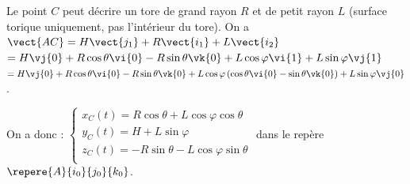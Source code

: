 \begin{corrigebox}
Le point $C$ peut décrire un tore de grand rayon $R$ et de petit rayon $L$ (surface torique uniquement, pas l'intérieur du tore).
On  a  $\vect{AC}=H\vect{j_1}+R\vect{i_1}+L\vect{i_2}$ $=H\vj{0}+R\cos\theta\vi{0}-R\sin\theta\vk{0}+L\cos\varphi\vi{1}+L\sin\varphi\vj{1}$ 
$=H\vj{0}+R\cos\theta\vi{0}-R\sin\theta\vk{0}+L\cos\varphi\left(\cos\theta\vi{0}-\sin\theta\vk{0} \right)+L\sin\varphi\vj{0}$ .

On a donc :
$\left\{
\begin{array}{l}
x_C(t)=R\cos\theta+L\cos\varphi\cos\theta \\
y_C(t)= H+L\sin\varphi\\
z_C(t)=  -R\sin\theta-L\cos\varphi\sin\theta\\
\end{array}
\right.
$ dans le repère $\repere{A}{i_0}{j_0}{k_0}$.
\end{corrigebox}

